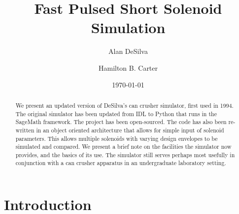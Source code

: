 \documentclass[prb,preprint]{revtex4-1}
\begin{document}

\title{Fast Pulsed Short Solenoid Simulation
}

\author{Alan DeSilva}

\author{Hamilton B. Carter}


\date{\today}

\begin{abstract}
We present an updated version of DeSilva's can crusher simulator, first used in 1994.  The original simulator has been updated from IDL to Python that runs in the SageMath framework.  The project has been open-sourced.  The code has also been re-written in an object oriented architecture that allows for simple input of solenoid parameters.  This allows multiple solenoids with varying design envelopes to be simulated and compared.  We present a brief note on the facilities the simulator now provides, and the basics of its use.  The simulator still serves perhaps most usefully in conjunction with a can crusher apparatus in an undergraduate laboratory setting.
\end{abstract}

\maketitle %


\section{Introduction} %
\end{document}
